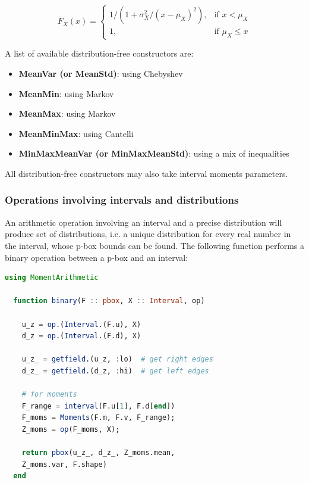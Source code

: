 \documentclass{juliacon}
\begin{document}
\begin{equation*}
  \overline{F}_{X}(x)  = \begin{cases} 1 / (1 + \sigma^{2}_{X}/(x - \mu_{X})^2),& \text{if } x<\mu_{X} \\
  1,& \text{if } \mu_{X}\leq x \end{cases}
\end{equation*}

A list of available distribution-free constructors are:

\begin{itemize}
  \item \textbf{MeanVar (or MeanStd)}: using Chebyshev
  \item \textbf{MeanMin}: using Markov
  \item \textbf{MeanMax}: using Markov
  \item \textbf{MeanMinMax}: using Cantelli
  \item \textbf{MinMaxMeanVar (or MinMaxMeanStd)}: using a mix of inequalities
\end{itemize}

All distribution-free constructors may also take interval moments parameters.

\subsubsection{Operations involving intervals and distributions} \hfill \break

An arithmetic operation involving an interval and a precise distribution will produce set of distributions, i.e. a unique distribution for every real number in the interval, whose p-box bounds can be found. The following function performs a binary operation between a p-box and an interval:

\begin{lstlisting}[language = Julia]
  using MomentArithmetic

  function binary(F :: pbox, X :: Interval, op)

    u_z = op.(Interval.(F.u), X)
    d_z = op.(Interval.(F.d), X)

    u_z_ = getfield.(u_z, :lo)  # get right edges
    d_z_ = getfield.(d_z, :hi)  # get left edges

    # for moments
    F_range = interval(F.u[1], F.d[end])
    F_moms = Moments(F.m, F.v, F_range);
    Z_moms = op(F_moms, X);

    return pbox(u_z_, d_z_, Z_moms.mean, 
    Z_moms.var, F.shape)
  end
\end{lstlisting}
\end{document}
